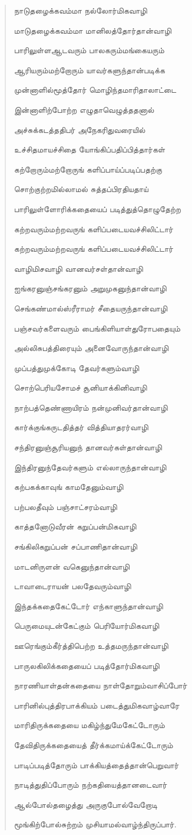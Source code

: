 \documentclass{article}
\begin{document}
\begin{quotation}
{நாடுதழைக்கவம்மா நல்லோர்மிகவாழி

மாடுதழைக்கவம்மா மானிலத்தோர்தான்வாழி

பாரிலுள்ளஆடவரும் பாலகரும்மங்கையரும்

ஆரியரும்மற்றோரும் யாவர்களுந்தான்படிக்க

முன்னாளில்மூத்தோர் மொழிந்தமாரிதாலாட்டை

இன்னாளிற்போற்ற எழுதாவெழுத்ததனால்

அச்சுக்கடத்ததிபர் அநேகரிதுவரையில்

உச்சிதமாயச்சிதை யோங்கிப்பதிப்பித்தார்கள்

கற்றோரும்மற்றோருங் களிப்பாய்ப்படிப்பதற்கு

சொற்குற்றமில்லாமல் சுத்தப்பிரதியதாய்

பாரிலுள்ளோரிக்கதையைப் படித்துத்தொழுதேற்ற

கற்றவரும்மற்றவருங் களிப்படையவச்சிலிட்டார்

கற்றவரும்மற்றவருங் களிப்படையவச்சிலிட்டார்

வாழிமிசவாழி வானவர்சள்‌தான்வாழி

ஐங்கரனுஞ்சங்கரனும் அறுமுகனுந்தான்வாழி

செங்கண்மால்ஸ்ரீராமர் சீதையருந்தான்வாழி

பஞ்சவர்களைவரும் பைங்கிளியாள்துரோபதையும்

அல்லிசுபத்திரையும் அனைவோருந்தான்வாழி

முப்பத்துமுக்கோடி தேவர்களும்வாழி

சொற்பெரியசோமச் சூனியாக்கினிவாழி

நாற்பத்தெண்ணாயிரம் நன்முனிவர்தான்வாழி

கார்க்குங்கருடதித்தர்‌ வித்தியாதரர்வாழி

சந்திரனுஞ்சூரியனுந் தானவர்கள்தான்வாழி

இந்திரனுந்தேவர்களும் எல்லாருந்தான்வாழி

கற்பகக்காவுங் காமதேனும்வாழி

பற்பலதீவும் பஞ்சாட்சரம்வாழி

காத்தனோடுவீரன் கறுப்பன்மிகவாழி

சங்கிலிகறுப்பன் சப்பாணிதான்வாழி

மாடனிருளன் வகெனுந்தான்வாழி

டாவாடைராயன் பலதேவரும்வாழி

இந்தக்கதைகேட்டோர் எந்காளுந்தான்வாழி

பெருமையுடன்கேட்கும் பெரியோர்மிகவாழி

ஊரெங்கும்கீர்த்திபெற்ற உத்தமருந்தான்வாழி

பாருலகிலிக்கதையைப் படித்தோர்மிகவாழி

நாரணியாள்தன்கதையை நாள்தோறும்வாசிப்போர்

பாரினில்புத்திரபாக்கியம் படைத்துமிகவாழ்வாரே

மாரிதிருக்கதையை மகிழ்ந்துமேகேட்டோரும்

தேவிதிருக்கதையைத் தீர்க்கமாய்க்கேட்டோரும்

பாடிப்படித்தோரும் பாக்கியத்தைத்தான்பெறுவார்

நாடித்துதிப்போரும் நற்கதியைத்தானடைவார்

ஆல்போல்தழைத்து அருகுபோல்வேறாேடி

மூங்கிற்போல்சுற்றம் முசியாமல்வாழ்ந்திருப்பார்.
}
\end{quotation}
\end{document}
